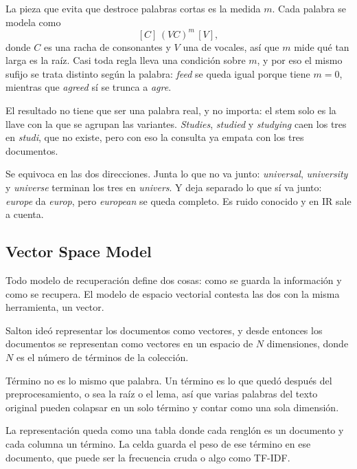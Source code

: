 \documentclass[11pt,letterpaper]{article}
\begin{document}
La pieza que evita que destroce palabras cortas es la medida $m$. Cada
palabra se modela como
\[
    [C]\,(VC)^{m}\,[V] ,
\]
donde $C$ es una racha de consonantes y $V$ una de vocales, así que $m$
mide qué tan larga es la raíz. Casi toda regla lleva una condición
sobre $m$, y por eso el mismo sufijo se trata distinto según la
palabra: \textit{feed} se queda igual porque tiene $m = 0$, mientras
que \textit{agreed} sí se trunca a \textit{agre}.

\begin{idea}
    El resultado no tiene que ser una palabra real, y no importa: el
    stem solo es la llave con la que se agrupan las variantes.
    \textit{Studies}, \textit{studied} y \textit{studying} caen los
    tres en \textit{studi}, que no existe, pero con eso la consulta ya
    empata con los tres documentos.
\end{idea}

Se equivoca en las dos direcciones. Junta lo que no va junto:
\textit{universal}, \textit{university} y \textit{universe} terminan
los tres en \textit{univers}. Y deja separado lo que sí va junto:
\textit{europe} da \textit{europ}, pero \textit{european} se queda
completo. Es ruido conocido y en IR sale a cuenta.


\subsection*{Vector Space Model}

\begin{idea}
    Todo modelo de recuperación define dos cosas: como se guarda la
    información y como se recupera. El modelo de espacio vectorial
    contesta las dos con la misma herramienta, un vector.
\end{idea}

Salton ideó representar los documentos como vectores, y desde entonces
los documentos se representan como vectores en un espacio de $N$
dimensiones, donde $N$ es el número de términos de la colección.

\begin{ojo}
    Término no es lo mismo que palabra. Un término es lo que quedó
    después del preprocesamiento, o sea la raíz o el lema, así que
    varias palabras del texto original pueden colapsar en un solo
    término y contar como una sola dimensión.
\end{ojo}

La representación queda como una tabla donde cada renglón es un
documento y cada columna un término. La celda guarda el peso de ese
término en ese documento, que puede ser la frecuencia cruda o algo
como TF-IDF.
\end{document}
